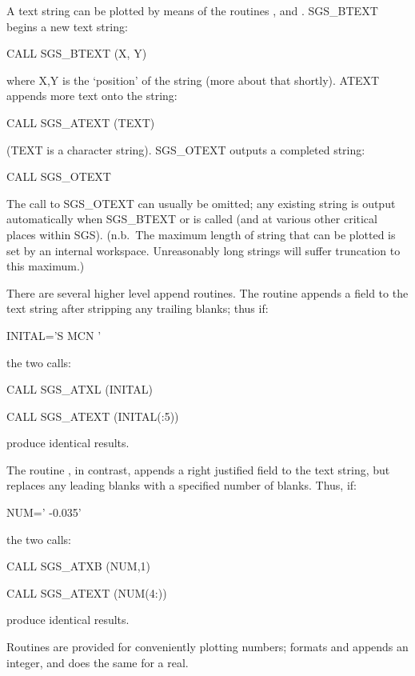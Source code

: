 \documentclass[11pt]{starlink}
\begin{document}
A text string can be plotted by means of the
routines
,
 and
.  SGS\_BTEXT begins a new
text string:
\begin{terminalv}
CALL SGS_BTEXT (X, Y)
\end{terminalv}
where X,Y is the `position' of the string (more about that
shortly).  ATEXT appends more text onto the string:
\begin{terminalv}
CALL SGS_ATEXT (TEXT)
\end{terminalv}
(TEXT is a character string).  SGS\_OTEXT outputs a completed string:
\begin{terminalv}
CALL SGS_OTEXT
\end{terminalv}
The call to SGS\_OTEXT can usually be omitted;  any existing string
is output automatically when SGS\_BTEXT or
 is called (and
at various other critical places within SGS).
(n.b.\ The maximum length of string that can be plotted is set by
an internal workspace.  Unreasonably long strings will suffer
truncation to this maximum.)

There are several higher level append routines.
The routine 
appends a field to the text string after stripping any trailing
blanks;  thus if:
\begin{terminalv}
INITAL='S MCN   '
\end{terminalv}
the two calls:
\begin{terminalv}
CALL SGS_ATXL (INITAL)

CALL SGS_ATEXT (INITAL(:5))
\end{terminalv}
produce identical results.

The routine
, in contrast, appends a right justified
field to the text string, but replaces any leading blanks with a
specified number of blanks.  Thus, if:
\begin{terminalv}
NUM='    -0.035'
\end{terminalv}
the two calls:
\begin{terminalv}
CALL SGS_ATXB (NUM,1)

CALL SGS_ATEXT (NUM(4:))
\end{terminalv}
produce identical results.

Routines are provided for conveniently plotting numbers;
formats and appends an integer, and
 does the same for a
real.
\end{document}
